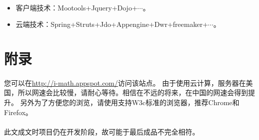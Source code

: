 \documentclass[12pt,a4paper,titlepage]{article}
\begin{document}
\paragraph{}
\begin{itemize}
 \item 客户端技术：Mootools+Jquery+Dojo+$\cdots$。
\item 云端技术：Spring+Struts+Jdo+Appengine+Dwr+freemaker+$\cdots$。
\end{itemize}



\section{附录}
\paragraph{}
您可以在\href{http://i-math.appspot.com/}{\color{blue}http://i-math.appspot.com/}访问该站点。
由于使用云计算，服务器在美国，所以网速会比较慢，请耐心等待。相信在不远的将来，在中国的网速会得到提升。
另外为了方便您的浏览，请使用支持W3c标准的浏览器，推荐Chrome和Firefox。
\paragraph{}
此文成文时项目仍在开发阶段，故可能于最后成品不完全相符。
\end{document}
